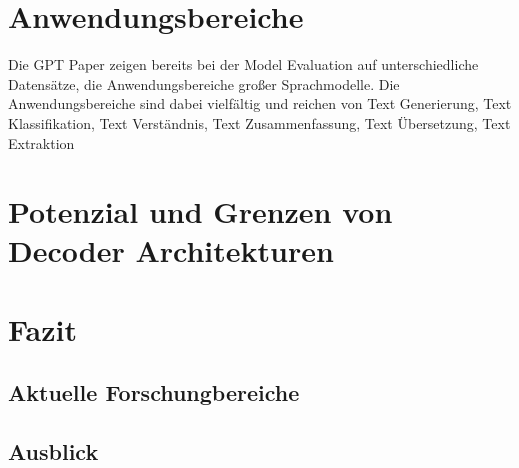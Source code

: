 \documentclass[conference]{IEEEtran}
\begin{document}
\section{Anwendungsbereiche}
Die GPT Paper zeigen bereits bei der Model Evaluation auf unterschiedliche Datensätze, die Anwendungsbereiche großer Sprachmodelle. Die Anwendungsbereiche sind dabei vielfältig und reichen von Text Generierung, Text Klassifikation, Text Verständnis, Text Zusammenfassung, Text Übersetzung, Text Extraktion

\section{Potenzial und Grenzen von Decoder Architekturen}


\section{Fazit}
\subsection{Aktuelle Forschungbereiche}
\subsection{Ausblick}






\end{document}
